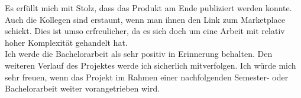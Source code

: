 Es erfüllt mich mit Stolz, dass das Produkt am Ende publiziert werden konnte.
Auch die Kollegen sind erstaunt, wenn man ihnen den Link zum Marketplace schickt.
Dies ist umso erfreulicher, da es sich doch um eine Arbeit mit relativ hoher Komplexität gehandelt hat.\\

Ich werde die Bachelorarbeit als sehr positiv in Erinnerung behalten.
Den weiteren Verlauf des Projektes werde ich sicherlich mitverfolgen.
Ich würde mich sehr freuen, wenn das Projekt im Rahmen einer nachfolgenden Semester- oder Bachelorarbeit weiter vorangetrieben wird.


